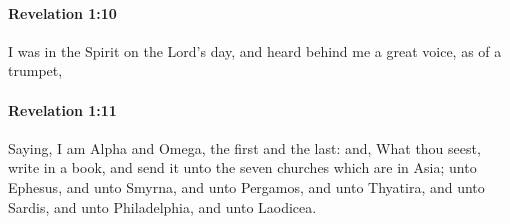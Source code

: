 		\paragraph{Revelation 1:10} %
			\label{REVELATIONNT-1-10}

			I was in the Spirit on the Lord's day, and heard behind me a great voice, as of a trumpet,

			\begin{framed}
			\scriptsize
				\begin{compactdesc}
					\item[SBLG] 
				\end{compactdesc}
			\end{framed}

		\paragraph{Revelation 1:11} %
			\label{REVELATIONNT-1-11}

			Saying, I am Alpha and Omega, the first and the last: and, What thou seest, write in a book, and send it unto the seven churches which are in Asia; unto Ephesus, and unto Smyrna, and unto Pergamos, and unto Thyatira, and unto Sardis, and unto Philadelphia, and unto Laodicea.

